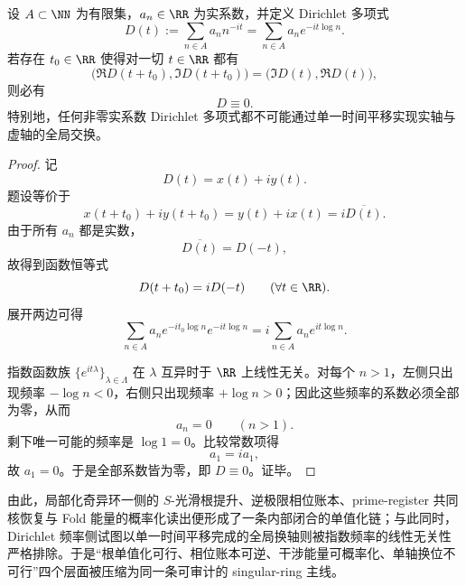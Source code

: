 \begin{theorem}\label{thm:xi-time-part65g-dirichlet-axis-swap-obstruction}
设 \(A\subset\NN\) 为有限集，\(a_n\in\RR\) 为实系数，并定义 Dirichlet 多项式
\[
D(t):=\sum_{n\in A}a_n n^{-it}
=
\sum_{n\in A}a_n e^{-it\log n}.
\]
若存在 \(t_0\in\RR\) 使得对一切 \(t\in\RR\) 都有
\[
\bigl(\Re D(t+t_0),\Im D(t+t_0)\bigr)
=
\bigl(\Im D(t),\Re D(t)\bigr),
\]
则必有
\[
D\equiv 0.
\]
特别地，任何非零实系数 Dirichlet 多项式都不可能通过单一时间平移实现实轴与虚轴的全局交换。
\end{theorem}
\begin{proof}
记
\[
D(t)=x(t)+iy(t).
\]
题设等价于
\[
x(t+t_0)+iy(t+t_0)=y(t)+ix(t)=i\overline{D(t)}.
\]
由于所有 \(a_n\) 都是实数，
\[
\overline{D(t)}=D(-t),
\]
故得到函数恒等式
\[
D(t+t_0)=iD(-t)
\qquad (\forall t\in\RR).
\]
展开两边可得
\[
\sum_{n\in A}a_n e^{-it_0\log n}e^{-it\log n}
=
i\sum_{n\in A}a_n e^{it\log n}.
\]

指数函数族 \(\{e^{it\lambda}\}_{\lambda\in\Lambda}\) 在 \(\lambda\) 互异时于 \(\RR\) 上线性无关。对每个 \(n>1\)，左侧只出现频率 \(-\log n<0\)，右侧只出现频率 \(+\log n>0\)；因此这些频率的系数必须全部为零，从而
\[
a_n=0
\qquad (n>1).
\]
剩下唯一可能的频率是 \(\log 1=0\)。比较常数项得
\[
a_1=ia_1,
\]
故 \(a_1=0\)。于是全部系数皆为零，即 \(D\equiv 0\)。证毕。
\end{proof}

由此，局部化奇异环一侧的 \(S\)-光滑根提升、逆极限相位账本、prime-register 共同核恢复与 Fold 能量的概率化读出便形成了一条内部闭合的单值化链；与此同时，Dirichlet 频率侧试图以单一时间平移完成的全局换轴则被指数频率的线性无关性严格排除。于是“根单值化可行、相位账本可逆、干涉能量可概率化、单轴换位不可行”四个层面被压缩为同一条可审计的 singular-ring 主线。

